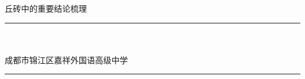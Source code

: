 
\begin{titlepage}
    \colorbox{black!5}{
        \parbox[t]{0.975\textwidth}{%
            \parbox[t]{0.95\textwidth}{%
                \raggedleft\vspace{0.75cm}\Huge\scshape
                丘砖中的重要结论梳理 \\[7.5pt]
                \large\bf 
                \vspace{0.75cm}
            }
        }
    }

    \vfill

    \parbox[t]{0.95\textwidth}{%
        \hfill\rule{0.15\linewidth}{0.5pt}\\[7.5pt]
        \raggedleft
        \textcopyright{}\\[4pt]
        
        \normalsize\textsuperscript{\textdagger} 成都市锦江区嘉祥外国语高级中学\\

        \hfill\rule{0.15\linewidth}{0.5pt}
    }
\end{titlepage}
